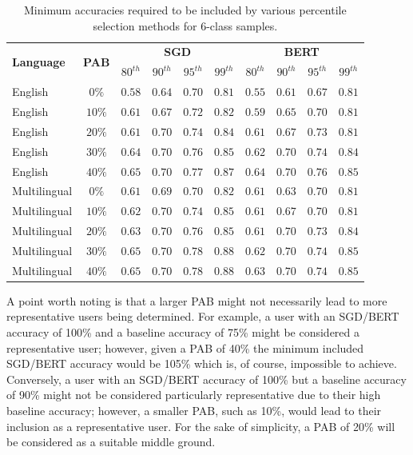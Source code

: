 \begin{table}[ht]
    \centering
    \begin{tabular}{l | c | c c c c | c c c c}
        \toprule
        \multirow{2}{*}{\textbf{Language}}&\multirow{2}{*}{\textbf{PAB}}&\multicolumn{4}{c}{\textbf{SGD}}&\multicolumn{4}{|c}{\textbf{BERT}}\\
        &&\textbf{$80^{th}$} & \textbf{$90^{th}$} & \textbf{$95^{th}$} & \textbf{$99^{th}$} & \textbf{$80^{th}$} & \textbf{$90^{th}$} & \textbf{$95^{th}$} & \textbf{$99^{th}$}\\\midrule
        English&$0\%$&$0.58$&$0.64$&$0.70$&$0.81$&$0.55$&$0.61$&$0.67$&$0.81$\\
        English&$10\%$&$0.61$&$0.67$&$0.72$&$0.82$&$0.59$&$0.65$&$0.70$&$0.81$\\
        English&$20\%$&$0.61$&$0.70$&$0.74$&$0.84$&$0.61$&$0.67$&$0.73$&$0.81$\\
        English&$30\%$&$0.64$&$0.70$&$0.76$&$0.85$&$0.62$&$0.70$&$0.74$&$0.84$\\
        English&$40\%$&$0.65$&$0.70$&$0.77$&$0.87$&$0.64$&$0.70$&$0.76$&$0.85$\\\midrule
        Multilingual&$0\%$&$0.61$&$0.69$&$0.70$&$0.82$&$0.61$&$0.63$&$0.70$&$0.81$\\
        Multilingual&$10\%$&$0.62$&$0.70$&$0.74$&$0.85$&$0.61$&$0.67$&$0.70$&$0.81$\\
        Multilingual&$20\%$&$0.63$&$0.70$&$0.76$&$0.85$&$0.61$&$0.70$&$0.73$&$0.84$\\
        Multilingual&$30\%$&$0.65$&$0.70$&$0.78$&$0.88$&$0.62$&$0.70$&$0.74$&$0.85$\\
        Multilingual&$40\%$&$0.65$&$0.70$&$0.78$&$0.88$&$0.63$&$0.70$&$0.74$&$0.85$\\
        \bottomrule
    \end{tabular}
    \caption{Minimum accuracies required to be included by various percentile selection methods for 6-class samples.}
    \label{tab:Res_PU_Pcts6}
\end{table}

A point worth noting is that a larger PAB might not necessarily lead to more representative users being determined. For example, a user with an SGD/BERT accuracy of 100\% and a baseline accuracy of 75\% might be considered a representative user; however, given a PAB of 40\% the minimum included SGD/BERT accuracy would be 105\% which is, of course, impossible to achieve. Conversely, a user with an SGD/BERT accuracy of 100\% but a baseline accuracy of 90\% might not be considered particularly representative due to their high baseline accuracy; however, a smaller PAB, such as 10\%, would lead to their inclusion as a representative user. For the sake of simplicity, a PAB of 20\% will be considered as a suitable middle ground.

